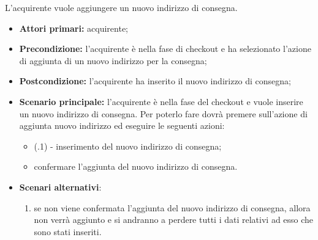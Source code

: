 
L'acquirente vuole aggiungere un nuovo indirizzo di consegna.
\begin{itemize}
    \item \textbf{Attori primari:} acquirente;
    \item \textbf{Precondizione:} l'acquirente è nella fase di checkout e ha selezionato l'azione di aggiunta di un nuovo indirizzo per la consegna;
    \item \textbf{Postcondizione:} l'acquirente ha inserito il nuovo indirizzo di consegna;
    \item \textbf{Scenario principale:} l'acquirente è nella fase del checkout e vuole inserire un nuovo indirizzo di consegna. Per poterlo fare dovrà premere sull'azione di aggiunta nuovo indirizzo ed eseguire le seguenti azioni:
    \begin{itemize}
        \item (\actualUC.1) - inserimento del nuovo indirizzo di consegna; 
        \item confermare l'aggiunta del nuovo indirizzo di consegna.
    \end{itemize}
    \item \textbf{Scenari alternativi}:
    \begin{enumerate}[label=\lett]
        \item se non viene confermata l'aggiunta del nuovo indirizzo di consegna, allora non verrà aggiunto e si andranno a perdere tutti i dati relativi ad esso che sono stati inseriti.
    \end{enumerate}
\end{itemize}

\resetSubUC

